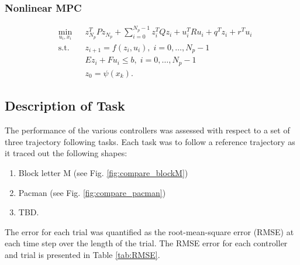 \subsubsection{Nonlinear MPC}

\begin{equation}
\begin{aligned}
& \underset{u_{i} , x_{i}}{\text{min}}
& & z_{N_p}^{T} P z_{N_p} + \sum_{i=0}^{N_p - 1} z_i^T Q z_i + u_i^T R u_i + q^T z_i + r^T u_i\\
& \text{s.t.}
& & z_{i+1} = f( z_i , u_i ) , \; i = 0 , \ldots , N_p - 1 \\
&&& E z_i + F u_i \leq b , \; i = 0 , \ldots , N_p - 1 \\
&&& z_0 = \psi(x_k).
\end{aligned}
\end{equation}

\subsection{Description of Task}

The performance of the various controllers was assessed with respect to a set of three trajectory following tasks.
Each task was to follow a reference trajectory as it traced out the following shapes:
\begin{enumerate}
    \item Block letter M (see Fig. \ref{fig:compare_blockM})
    \item Pacman (see Fig. \ref{fig:compare_pacman})
    \item TBD.
\end{enumerate}
The error for each trial was quantified as the root-mean-square error (RMSE) at each time step over the length of the trial.
The RMSE error for each controller and trial is presented in Table \ref{tab:RMSE}.